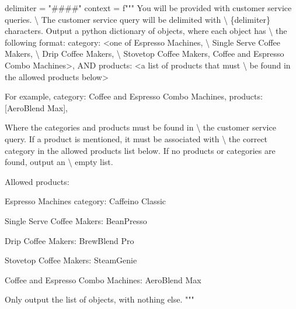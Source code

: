 \documentclass[
  letterpaper,
  DIV=11,
  numbers=noendperiod]{scrreprt}
\newenvironment{Shaded}{\begin{snugshade}}{\end{snugshade}}
\newcommand{\CharTok}[1]{\textcolor[rgb]{0.13,0.47,0.30}{#1}}
\newcommand{\NormalTok}[1]{\textcolor[rgb]{0.00,0.23,0.31}{#1}}
\newcommand{\OperatorTok}[1]{\textcolor[rgb]{0.37,0.37,0.37}{#1}}
\newcommand{\SpecialCharTok}[1]{\textcolor[rgb]{0.37,0.37,0.37}{#1}}
\newcommand{\SpecialStringTok}[1]{\textcolor[rgb]{0.13,0.47,0.30}{#1}}
\newcommand{\StringTok}[1]{\textcolor[rgb]{0.13,0.47,0.30}{#1}}
\begin{document}
\begin{Shaded}
\begin{Highlighting}[]
\NormalTok{delimiter }\OperatorTok{=} \StringTok{"\#\#\#\#"}
\NormalTok{context }\OperatorTok{=} \SpecialStringTok{f"""}
\SpecialStringTok{You will be provided with customer service queries. }\CharTok{\textbackslash{}}
\SpecialStringTok{The customer service query will be delimited with }\CharTok{\textbackslash{}}
\SpecialCharTok{\{}\NormalTok{delimiter}\SpecialCharTok{\}}\SpecialStringTok{ characters.}
\SpecialStringTok{Output a python dictionary of objects, where each object has }\CharTok{\textbackslash{}}
\SpecialStringTok{the following format:}
\SpecialStringTok{    \textquotesingle{}category\textquotesingle{}: \textless{}one of Espresso Machines, }\CharTok{\textbackslash{}}
\SpecialStringTok{    Single Serve Coffee Makers, }\CharTok{\textbackslash{}}
\SpecialStringTok{    Drip Coffee Makers, }\CharTok{\textbackslash{}}
\SpecialStringTok{    Stovetop Coffee Makers,}
\SpecialStringTok{    Coffee and Espresso Combo Machines\textgreater{},}
\SpecialStringTok{AND}
\SpecialStringTok{    \textquotesingle{}products\textquotesingle{}: \textless{}a list of products that must }\CharTok{\textbackslash{}}
\SpecialStringTok{    be found in the allowed products below\textgreater{}}

\SpecialStringTok{For example,}
\SpecialStringTok{  \textquotesingle{}category\textquotesingle{}: \textquotesingle{}Coffee and Espresso Combo Machines\textquotesingle{}, \textquotesingle{}products\textquotesingle{}: [\textquotesingle{}AeroBlend Max\textquotesingle{}],}

\SpecialStringTok{Where the categories and products must be found in }\CharTok{\textbackslash{}}
\SpecialStringTok{the customer service query.}
\SpecialStringTok{If a product is mentioned, it must be associated with }\CharTok{\textbackslash{}}
\SpecialStringTok{the correct category in the allowed products list below.}
\SpecialStringTok{If no products or categories are found, output an }\CharTok{\textbackslash{}}
\SpecialStringTok{empty list.}

\SpecialStringTok{Allowed products:}

\SpecialStringTok{Espresso Machines category:}
\SpecialStringTok{Caffeino Classic}

\SpecialStringTok{Single Serve Coffee Makers:}
\SpecialStringTok{BeanPresso}

\SpecialStringTok{Drip Coffee Makers:}
\SpecialStringTok{BrewBlend Pro}

\SpecialStringTok{Stovetop Coffee Makers:}
\SpecialStringTok{SteamGenie}

\SpecialStringTok{Coffee and Espresso Combo Machines:}
\SpecialStringTok{AeroBlend Max}

\SpecialStringTok{Only output the list of objects, with nothing else.}
\SpecialStringTok{"""}
\end{Highlighting}
\end{Shaded}
\end{document}
